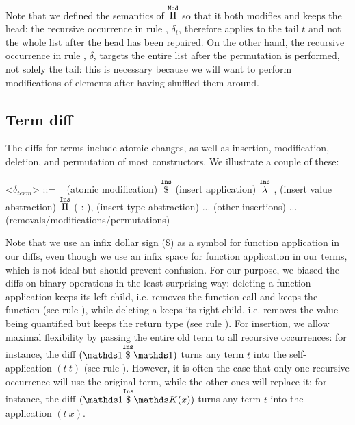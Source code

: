 Note that we defined the semantics of $\overset{\mathtt{Mod}}{\Pi}$ so that it both modifies
and keeps the head: the recursive occurrence in rule ,
$\delta_t$, therefore applies to the tail $t$ and not the whole list after the
head has been repaired.  On the other hand, the recursive occurrence in
rule , $\delta$, targets the entire list after the permutation
is performed, not solely the tail: this is necessary because we will want to
perform modifications of elements after having shuffled them around.

\subsection{Term diff}\label{chick-diffs-term-diff}

The diffs for terms include atomic changes, as well as insertion, modification,
deletion, and permutation of most constructors.  We illustrate a couple of
these:

\begin{grammar}
<$\delta_{term}$> ::= \ %
\alt {} \hfill (atomic modification)
\alt {} $\overset{\mathtt{Ins}}{ \$ }$  \hfill
(insert application)
\alt $\overset{\mathtt{Ins}}{\lambda}$ ,  \hfill (insert value
abstraction)
\alt $\overset{\mathtt{Ins}}{\Pi}$ ( : ),
 \hfill (insert type abstraction)
\alt ... \hfill (other insertions)
\alt ... \hfill (removals/modifications/permutations)
\end{grammar}

\noindent Note that we use an infix dollar sign ($\$$) as a symbol for function
application in our diffs, even though we use an infix space for function
application in our terms, which is not ideal but should prevent confusion.  For
our purpose, we biased the diffs on binary operations in the least surprising
way: deleting a function application keeps its left child, i.e. removes the
function call and keeps the function (see rule ), while
deleting a  keeps its right child, i.e. removes the value being
quantified but keeps the return type (see rule ).  For
insertion, we allow maximal flexibility by passing the entire old term to all
recursive occurrences: for instance, the diff
$(\MathInsApp{\MathSame}{\MathSame})$ turns any term $t$ into the
self-application $(t\ t)$ (see rule ).  However, it is often
the case that only one recursive occurrence will use the original term, while
the other ones will replace it: for instance, the diff
$(\MathInsApp{\MathSame}{\MathReplace{x}})$ turns any term $t$ into the
application $(t\ x)$.

